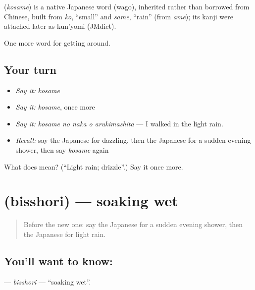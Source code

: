 \begin{cousinweb}
\textbf{} (\emph{kosame}) is a native Japanese word (wago), inherited rather than borrowed from Chinese, built from \emph{ko}, \textquotedblleft{}small\textquotedblright{} and \emph{same}, \textquotedblleft{}rain\textquotedblright{} (from \emph{ame}); its kanji were attached later as kun'yomi (JMdict).
\end{cousinweb}

\begin{grammarlens}[title={What you've built}]
One more word for getting around.
\end{grammarlens}

\subsection*{Your turn}
\begin{itemize}
\raggedright
  \item \emph{Say it:} \emph{kosame}
  \item \emph{Say it:} \emph{kosame}, once more
  \item \emph{Say it:} \emph{kosame no naka o arukimashita} — I walked in the light rain.
  \item \emph{Recall:} say the Japanese for dazzling, then the Japanese for a sudden evening shower, then say \emph{kosame} again
\end{itemize}

\begin{tcolorbox}[breakable,colback=teal!4,colframe=teal!35!black,title={Before you move on}]
What does  mean? (\textquotedblleft{}Light rain; drizzle\textquotedblright{}.) Say it once more.
\end{tcolorbox}
\section[\texorpdfstring{\ja{びっしょり} (bisshori)}{びっしょり (bisshori)}]{ (bisshori) — soaking wet}

\label{lesson:JA-C415-bisshori}



\begin{quote}
Before the new one: say the Japanese for a sudden evening shower, then the Japanese for light rain.
\end{quote}

\subsection*{You'll want to know: }
\textbf{} — \emph{bisshori} — \textquotedblleft{}soaking wet\textquotedblright{}.

